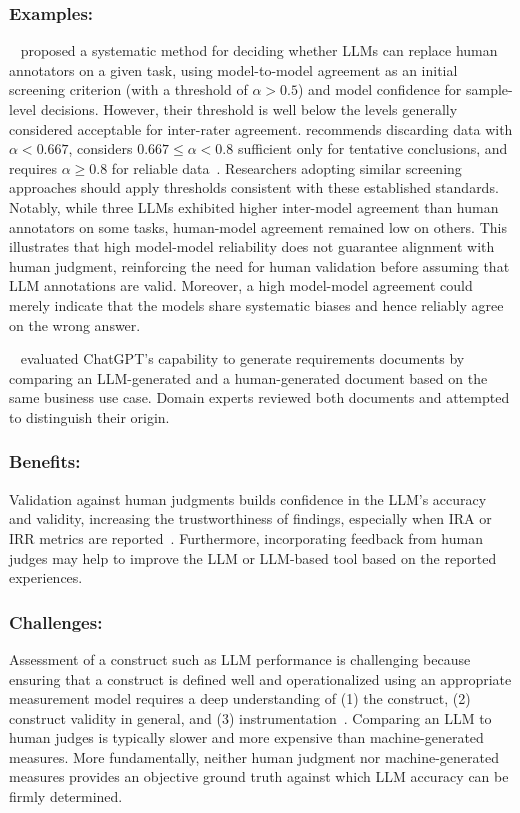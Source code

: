 \documentclass[smallextended]{svjour3}
\newcommand{\guidelinesubsubsection}[1]{\subsubsection{\bfseries #1:}}
\newcommand{\guidelinesubsubsection}[1]{\subsubsection{#1}}
\begin{document}
\guidelinesubsubsection{Examples}

\citeauthor{DBLP:conf/msr/AhmedDTP25}~\cite{DBLP:conf/msr/AhmedDTP25} proposed a systematic method for deciding whether LLMs can replace human annotators on a given task, using model-to-model agreement as an initial screening criterion (with a threshold of $\alpha>0.5$) and model confidence for sample-level decisions. However, their threshold is well below the levels generally considered acceptable for inter-rater agreement.
\citeauthor{Krippendorff2018} recommends discarding data with $\alpha<0.667$, considers $0.667 \leq \alpha < 0.8$ sufficient only for tentative conclusions, and requires $\alpha \geq 0.8$ for reliable data~\cite{Krippendorff2018}. Researchers adopting similar screening approaches should apply thresholds consistent with these established standards. Notably, while three LLMs exhibited higher inter-model agreement than human annotators on some tasks, human-model agreement remained low on others.
This illustrates that high model-model reliability does not guarantee alignment with human judgment, reinforcing the need for human validation before assuming that LLM annotations are valid.
Moreover, a high model-model agreement could merely indicate that the models share systematic biases and hence reliably agree on the wrong answer.

\citeauthor{DBLP:journals/corr/abs-2501-19297}~\cite{DBLP:journals/corr/abs-2501-19297} evaluated ChatGPT's capability to generate requirements documents by comparing an LLM-generated and a human-generated document based on the same business use case. Domain experts reviewed both documents and attempted to distinguish their origin.

\guidelinesubsubsection{Benefits}

Validation against human judgments builds confidence in the LLM's accuracy and validity, increasing the trustworthiness of findings, especially when IRA or IRR metrics are reported~\cite{khraisha2024canlargelanguagemodelshumans}. Furthermore, incorporating feedback from human judges may help to improve the LLM or LLM-based tool based on the reported experiences.

\guidelinesubsubsection{Challenges}

Assessment of a construct such as LLM performance is challenging because ensuring that a construct is defined well and operationalized using an appropriate measurement model requires a deep understanding of (1) the construct, (2) construct validity in general, and (3) instrumentation~\cite{DBLP:journals/tse/SjobergB23,DBLP:books/sp/24/RalphKAA24}. Comparing an LLM to human judges is typically slower and more expensive than machine-generated measures. More fundamentally, neither human judgment nor machine-generated measures provides an objective ground truth against which LLM accuracy can be firmly determined.   
\end{document}
